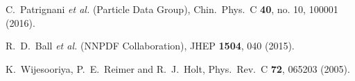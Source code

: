   C.~Patrignani {\it et al.} (Particle Data Group),
  Chin.\ Phys.\ C {\bf 40}, no. 10, 100001 (2016).

  R.~D.~Ball {\it et al.} (NNPDF Collaboration),
  JHEP {\bf 1504}, 040 (2015).

  K.~Wijesooriya, P.~E.~Reimer and R.~J.~Holt,
  Phys.\ Rev.\ C {\bf 72}, 065203 (2005).
